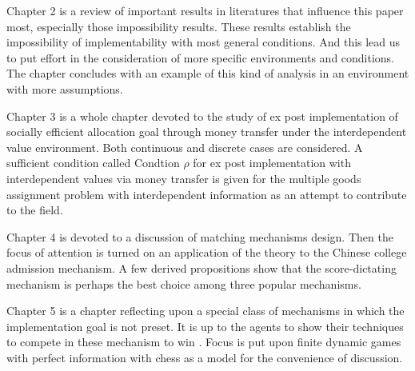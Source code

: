 Chapter 2 is a review of important results in literatures that influence this paper most, especially those
impossibility results. These results establish the impossibility of implementability with most general conditions. And this lead us to put effort in the consideration of more specific environments and conditions. The chapter concludes with an example of this kind of analysis in an environment with more assumptions.

Chapter 3 is a whole chapter devoted to the study of ex post implementation of socially efficient allocation goal through money transfer under the interdependent value environment. Both continuous and discrete cases are considered. A sufficient condition called Condtion $\rho$ for ex post implementation with interdependent values via money transfer is given for the multiple goods assignment problem with interdependent information as an attempt to contribute to the field. 

Chapter 4 is devoted to a discussion of matching mechanisms design. Then the focus of attention is turned on an application of the theory to the Chinese college admission mechanism. A few derived propositions show that the score-dictating mechanism is perhaps the best choice among three popular mechanisms.

Chapter 5 is a chapter reflecting upon a special class of mechanisms in which the implementation goal is not preset. It is up to the agents to show their techniques to compete in these mechanism to win . Focus is put upon finite dynamic games with perfect information with chess as a model for the convenience of discussion.





